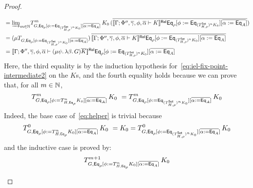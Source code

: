 \documentclass[acmsmall,review,anonymous]{acmart}
\theoremstyle{definition}
\newcommand{\set}{\mathsf{Set}}
\begin{document}
\begin{proof}
\begin{itemize}
\begin{itemize}
\[\begin{split}
&= \colim{m \in \nat} {T^m_{G, \Eq_{\rho}[\phi := \Eq_{(T^{\set}_{H,\rho})^n K_0}][\overline{\alpha := \Eq_A}]}}\,K_0
  \,(\ol{\relsem{\Gamma; \Phi'', \ol\gamma, \phi, \ol{\alpha} \vdash K}\Eq_{\rho}
  [\phi := \Eq_{(T^{\set}_{H,\rho})^n K_0}][\overline{\alpha := \Eq_A}]}) \\ 
&= (\mu {T_{G, \Eq_{\rho}[\phi := \Eq_{(T^{\set}_{H,\rho})^n K_0}][\overline{\alpha := \Eq_A}]}})
  \,\ol{\relsem{\Gamma; \Phi'', \ol\gamma, \phi, \ol{\alpha} \vdash K}\Eq_{\rho}
  [\phi := \Eq_{(T^{\set}_{H,\rho})^n K_0}][\overline{\alpha := \Eq_A}]} \\ 
&= \relsem{\Gamma; \Phi'', \ol\gamma, \phi, \ol{\alpha} \vdash (\mu \psi.\, \lambda \beta.\, G) \ol{K}}
  \Eq_{\rho}[\phi := \Eq_{(T^{\set}_{H,\rho})^n K_0}][\overline{\alpha := \Eq_{A}}]
\end{split}
\]
Here, the third equality is by the induction hypothesis
for~\eqref{eq:iel-fix-point-intermediate2} on the $K$s, and the fourth
equality holds because we can prove that, for all $m \in \mathbb{N}$,
\begin{equation}\label{eq:helper}
T^m_{G,
\Eq_{\rho}[\phi := T^{n}_{H,\Eq_{\rho}} K_0][\overline{\alpha :=
    \Eq_A}]}\,K_0 \ = T^m_{G, \Eq_{\rho}[\phi :=
    \Eq_{(T^{\set}_{H,\rho})^n K_0}][\overline{\alpha :=
      \Eq_A}]}\,K_0
\end{equation}
Indeed, the base case of~\eqref{eq:helper} is trivial because
\[T^0_{G,
  \Eq_{\rho}[\phi := T^{n}_{H,\Eq_{\rho}} K_0][\overline{\alpha :=
      \Eq_A}]}\,K_0 \ = K_0 = T^0_{G, \Eq_{\rho}[\phi :=
    \Eq_{(T^{\set}_{H,\rho})^n K_0}][\overline{\alpha :=
      \Eq_A}]}\,K_0\]
and the inductive case is proved by: \\
\begin{align*}
& T^{m+1}_{G, \Eq_{\rho}[\phi := T^{n}_{H,\Eq_{\rho}} K_0][\overline{\alpha := \Eq_A}]}\,K_0 \\

\end{align*}
\end{itemize}
\end{itemize}
\end{proof}
\end{document}
